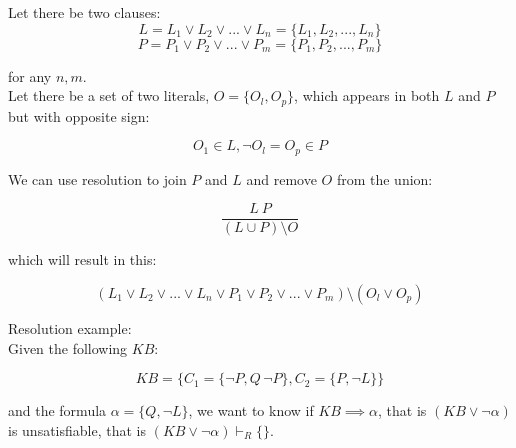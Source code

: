 \documentclass{article}
\begin{document}
Let there be two clauses:
\begin{equation*}
    L=L_1 \lor L_2 \lor ... \lor L_n = \{L_1, L_2, ..., L_n\}
\end{equation*}
\begin{equation*}
    P=P_1 \lor P_2 \lor ... \lor P_m = \{P_1, P_2, ..., P_m\}
\end{equation*}

for any $n, m$. \\
Let there be a set of two literals, $O=\{O_l,O_p\}$, which appears in both $L$ and $P$ but with opposite sign:

\begin{equation*}
    O_1 \in L, \neg O_l = O_p \in P
\end{equation*}

We can use resolution to join $P$ and $L$ and remove $O$ from the union:

\begin{equation*}
    \frac{L\ P}{(L \cup P) \setminus O}
\end{equation*}

which will result in this:

\begin{equation*}
    (L_1 \lor L_2 \lor ... \lor L_n \lor P_1 \lor P_2 \lor ... \lor P_m) \setminus (O_l \lor O_p)
\end{equation*}

\newpage

Resolution example: \\

Given the following $KB$:

\begin{equation*}
    KB = \{C_1=\{\neg P, Q\, \neg P\}, C_2=\{P, \neg L\}\}
\end{equation*}

and the formula $\alpha = \{Q, \neg L\}$, we want to know if $KB \implies \alpha$, that is $(KB \lor \neg \alpha)$ is unsatisfiable, that is $(KB \lor \neg \alpha) \vdash_R \{\}$.
\end{document}
